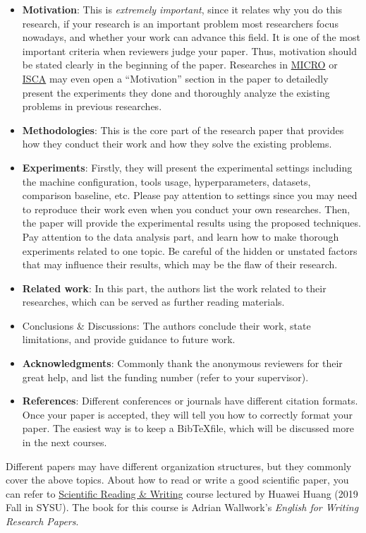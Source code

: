 \documentclass[english]{../TexTemplate/thesis}
\begin{document}
\begin{itemize}
	\item \textbf{Motivation}: This is \emph{extremely important}, since it relates why you do this research, if your research is an important problem most researchers focus nowadays, and whether your work can advance this field. It is one of the most important criteria when reviewers judge your paper. Thus, motivation should be stated clearly in the beginning of the paper. Researches in \href{https://www.microarch.org/}{MICRO} or \href{https://iscaconf.org/}{ISCA} may even open a ``Motivation'' section in the paper to detailedly present the experiments they done and thoroughly analyze the existing problems in previous researches.
	\item \textbf{Methodologies}: This is the core part of the research paper that provides how they conduct their work and how they solve the existing problems.
	\item \textbf{Experiments}: Firstly, they will present the experimental settings including the machine configuration, tools usage, hyperparameters, datasets, comparison baseline, etc. Please pay attention to settings since you may need to reproduce their work even when you conduct your own researches. Then, the paper will provide the experimental results using the proposed techniques. Pay attention to the data analysis part, and learn how to make thorough experiments related to one topic. Be careful of the hidden or unstated factors that may influence their results, which may be the flaw of their research.
	\item \textbf{Related work}: In this part, the authors list the work related to their researches, which can be served as further reading materials.
	\item Conclusions \& Discussions: The authors conclude their work, state limitations, and provide guidance to future work.
	\item \textbf{Acknowledgments}: Commonly thank the anonymous reviewers for their great help, and list the funding number (refer to your supervisor).
	\item \textbf{References}: Different conferences or journals have different citation formats. Once your paper is accepted, they will tell you how to correctly format your paper. The easiest way is to keep a Bib\TeX file, which will be discussed more in the next courses.
\end{itemize}

Different papers may have different organization structures, but they commonly cover the above topics.
About how to read or write a good scientific paper, you can refer to \href{http://inpluslab.com/paperwriting}{Scientific Reading \& Writing} course lectured by Huawei Huang (2019 Fall in SYSU).
The book for this course is Adrian Wallwork's \emph{English for Writing Research Papers}.
\end{document}
